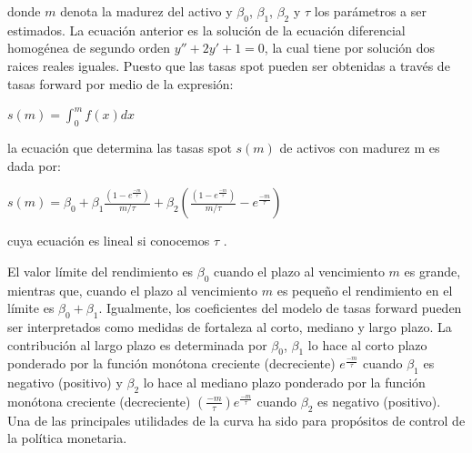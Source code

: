 \vspace*{0.2 cm}

\noindent donde $m$ denota la madurez del activo y $\beta_{0}$, $\beta_{1}$, $\beta_{2}$ y $\tau$ los par\'ametros a ser
estimados. La ecuaci\'on anterior es la soluci\'on de la ecuaci\'on diferencial homog\'enea de segundo orden $y'' + 2y' + 1 = 0$, la cual tiene por soluci\'on dos raices reales iguales. Puesto que las tasas spot pueden ser obtenidas a trav\'es de tasas
forward por medio de la expresi\'on:

\vspace*{0.2 cm}

\begin{center}
$\displaystyle{s(m) = \int_{0}^{m}f(x)dx}$
\end{center}

\vspace*{0.2 cm}


\noindent la ecuaci\'on que determina las tasas spot $s(m)$ de activos con madurez m es dada por:

\vspace*{0.2 cm}


\begin{center}
$\displaystyle{s(m) = \beta_{0}+ \beta_{1}\frac{\left(1-e^\frac{-m}{\tau}\right)}{m/\tau} + \beta_{2} \left(\frac{\left(1-e^\frac{-m}{\tau}\right)}{m/\tau} -  e^\frac{-m}{\tau}\right)}$
\end{center}

\vspace*{0.2 cm}

\noindent cuya ecuaci\'on es lineal si conocemos $\tau$ .

\hspace*{0.4 cm} El valor l\'imite del rendimiento es $\beta_{0}$ cuando el plazo al vencimiento $m$ es grande, mientras que, cuando el plazo al vencimiento $m$ es peque\~no el
rendimiento en el l\'imite es $\beta_{0}+\beta_{1}$. Igualmente, los coeficientes del
modelo de tasas forward pueden ser interpretados como medidas de
fortaleza al corto, mediano y largo plazo. La contribuci\'on al largo plazo
es determinada por $\beta_{0}$, $\beta_{1}$ lo hace al corto plazo ponderado por la
funci\'on mon\'otona creciente (decreciente) $e^{\frac{-m}{\tau}}$ cuando $\beta_{1}$ es negativo
(positivo) y $\beta_{2}$ lo hace al mediano plazo ponderado por la funci\'on
mon\'otona creciente (decreciente) $(\frac{-m}{\tau}) e^{\frac{-m}{\tau}}$ cuando $\beta_{2}$ es negativo
(positivo). Una de las principales utilidades de la curva ha sido para
prop\'ositos de control de la pol\'itica monetaria.

